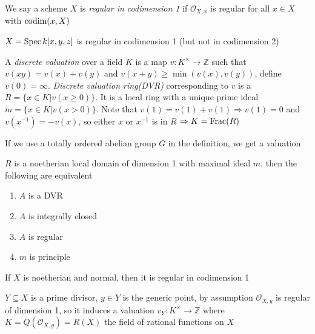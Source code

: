 \documentclass[main]{subfiles}
\begin{document}
\begin{definition}
We say a scheme $X$ is \textit{regular in codimension 1} if $\mathcal O_{X,x}$ is regular for all $x\in X$ with $\operatorname{codim}(x,X)$
\end{definition}

\begin{example}
$X=\operatorname{Spec} k[x,y,z]$ is regular in codimension 1 (but not in codimension 2)
\end{example}

\begin{definition}
A \textit{discrete valuation} over a field $K$ is a map $v:K^\times\to\mathbb Z$ such that $v(xy)=v(x)+v(y)$ and $v(x+y)\geq\min(v(x),v(y))$, define $v(0)=\infty$. \textit{Discrete valuation ring(DVR)} corresponding to $v$ is a $R=\{x\in K|v(x\geq0)\}$. It is a local ring with a unique prime ideal $m=\{x\in K|v(x>0)\}$. Note that $v(1)=v(1)+v(1)\Rightarrow v(1)=0$ and $v(x^{-1})=-v(x)$, so either $x$ or $x^{-1}$ is in $R$ $\Rightarrow K=\operatorname{Frac}(R)$
\end{definition}

\begin{remark}
If we use a totally ordered abelian group $G$ in the definition, we get a valuation
\end{remark}

\begin{proposition}
$R$ is a noetherian local domain of dimension 1 with maximal ideal $m$, then the following are equivalent
\begin{enumerate}
\item $A$ is a DVR
\item $A$ is integrally closed
\item $A$ is regular
\item $m$ is principle
\end{enumerate}
\end{proposition}

\begin{corollary}
If $X$ is noetherian and normal, then it is regular in codimension 1
\end{corollary}

\begin{definition}

\end{definition}

\clubsuit\quad $Y\subseteq X$ is a prime divisor, $y\in Y$ is the generic point, by assumption $\mathcal O_{X,y}$ is regular of dimension 1, so it induces a valuation $v_Y:K^\times\to\mathbb Z$ where $K=Q(\mathcal O_{X,y})=R(X)$ the field of rational functions on $X$
\end{document}
